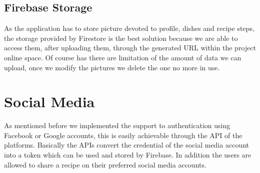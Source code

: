 \subsection{Firebase Storage}
As the application has to store picture devoted to profile, dishes and recipe steps, the storage provided by Firestore is the best solution because we are able to access them, after uploading them, through the generated URL within the project online space. 
Of course has there are limitation of the amount of data we can upload, once we modify the pictures we delete the one no more in use.

\section{Social Media}
As mentioned before we implemented the support to authentication using Facebook or Google accounts, this is easily achievable through the API of the platforms.
Basically the APIs convert the credential of the social media account into a token which can be used and stored by Firebase. 
In addition the users are allowed to share a recipe on their preferred social media accounts.
